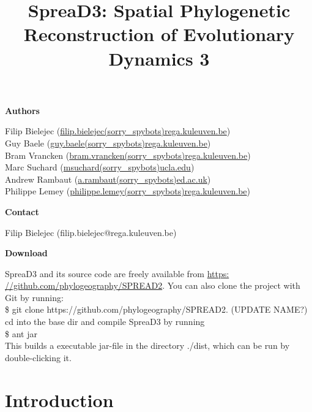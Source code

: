 \documentclass[english]{paper}
\def \spreadname {SpreaD3}
\begin{document}
\title{{\spreadname}: Spatial Phylogenetic Reconstruction of Evolutionary Dynamics 3}
\maketitle

\begin{flushleft}
\textbf{Authors}
\par\end{flushleft}

\noindent
Filip Bielejec (\url{filip.bielejec(sorry_spybots)rega.kuleuven.be}) \\
Guy Baele (\url{guy.baele(sorry_spybots)rega.kuleuven.be}) \\
Bram Vrancken  (\url{bram.vrancken(sorry_spybots)rega.kuleuven.be}) \\
Marc Suchard (\url{msuchard(sorry_spybots)ucla.edu})\\
Andrew Rambaut (\url{a.rambaut(sorry_spybots)ed.ac.uk}) \\
Philippe Lemey (\url{philippe.lemey(sorry_spybots)rega.kuleuven.be}) \\

\begin{flushleft}
\textbf{Contact}
\par\end{flushleft}
Filip Bielejec (filip.bielejec@rega.kuleuven.be) 


\begin{flushleft}
\textbf{Download}
\par\end{flushleft}
SpreaD3 and its source code are freely available from \url{https: //github.com/phylogeography/SPREAD2}.
You can also clone the project with Git by running: 
\\\$ git clone https://github.com/phylogeography/SPREAD2. (UPDATE NAME?)
\\
cd into the base dir and compile SpreaD3 by running 
\\\$ ant jar
\\
This builds a executable jar-file in the directory ./dist, which can be run by double-clicking it.

\pagebreak{}
\tableofcontents{}
\pagebreak{}

\section{Introduction}
\end{document}
